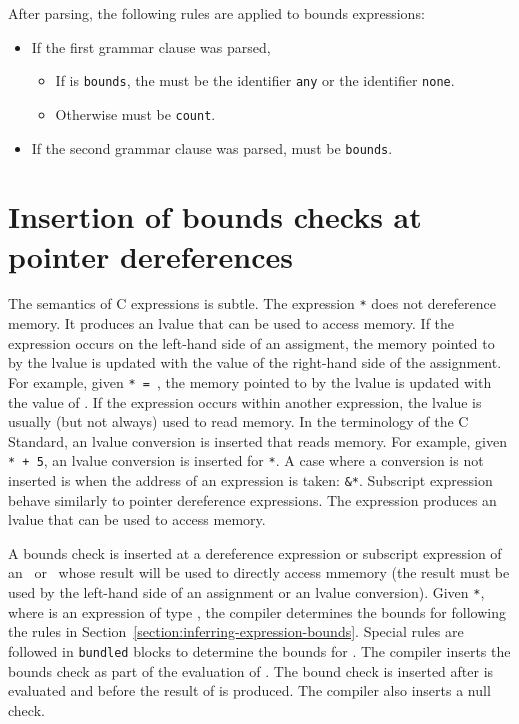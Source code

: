 After parsing, the following rules are applied to bounds
expressions:
\begin{itemize}
\item If the first grammar clause was parsed,
\begin{itemize}
\item If  is \texttt{bounds}, the 
must be the identifier \texttt{any} or the identifier \texttt{none}.
\item Otherwise  must be \texttt{count}.
\end{itemize}
\item If the second grammar clause was parsed,  must be
\texttt{bounds}.
\end{itemize}

\section{Insertion of bounds checks at pointer dereferences}

\label{section:bounds-checking-indirections}
The semantics of C expressions is subtle.  The expression
\texttt{*} does not dereference memory.  It
produces an lvalue that can be used to access memory. If the expression
occurs on the left-hand side of an assigment, the memory pointed to
by the lvalue is updated with the value of the right-hand side of
the assignment.
For example, given \texttt{* = },
the memory pointed to by the lvalue is updated with the value of .
If the expression occurs within another expression, the lvalue is usually 
(but not always)  used to read memory.  In the terminology of the C Standard,
an lvalue conversion is inserted that reads memory. For example, given \texttt{* + 5},
an lvalue conversion is inserted for \texttt{*}.  A case where a
conversion is not inserted is  when the address of an expression is taken:
\texttt{\&*}. Subscript expression behave similarly to pointer
dereference expressions.  The expression \texttt{} produces
an lvalue that can be used to access memory.
 
A bounds check is inserted at a dereference expression or subscript expression 
of an \arrayptr\ or \ntarrayptr\ whose result will be used to directly
access mmemory (the result must be used by the left-hand side of an
assignment or an lvalue conversion).
Given \texttt{*}, where  is an expression of type
\arrayptr, the compiler determines the bounds for 
following the rules in Section~\ref{section:inferring-expression-bounds}.
Special rules are followed in
\texttt{bundled} blocks to determine the bounds for . The
compiler inserts the bounds check as part of the evaluation of .
The bound check is inserted after  is evaluated and before the result of
 is produced.  The compiler also inserts a null check.

